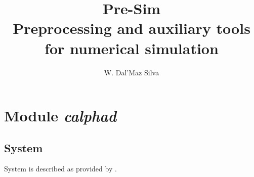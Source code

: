 \documentclass[12pt]{article}%
\title{Pre-Sim\\[0.2em]\smaller{}Preprocessing and auxiliary tools for numerical simulation}
\author{W. Dal'Maz Silva}
\begin{document}
\maketitle%
\tableofcontents%
\clearpage%

\section{Module \emph{calphad}}

\subsection{System }

System  is described as provided by \cite{Hallstedt1990}.

%
%
%
%
%	
%	
%
%
%
%
\end{document}
